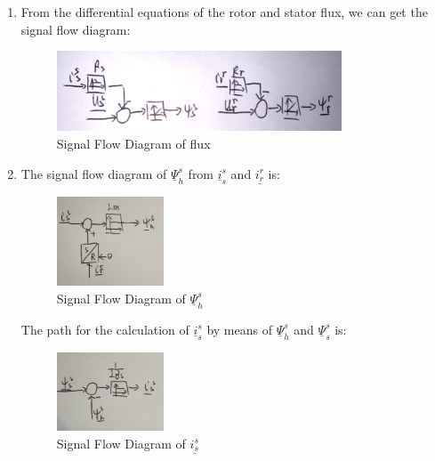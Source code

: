 \documentclass[12pt,a4paper, openany]{book}
\begin{document}
\begin{enumerate}
\item 
From the differential equations of the rotor and stator flux, we can get the signal flow diagram:
\begin{figure}[H]
    \centering
    \includegraphics[width=0.8\textwidth]{figures/SignalFlowDiagram.png}
    \caption{Signal Flow Diagram of flux}
    \label{fig:SignalFlowDiagram}
\end{figure}
\item 
The signal flow diagram of $\underline{\Psi}_h^s$ from $\underline{i}_{s}^s$ and $\underline{i_{r}^r}$ is:
\begin{figure}[H]
    \centering
    \includegraphics[width=0.3\textwidth]{figures/SignalFlowDiagram_h.png}
    \caption{Signal Flow Diagram of $\underline{\Psi}_h^s$}
    \label{fig:SignalFlowDiagram_h}
\end{figure}

The  path for the calculation of $\underline{i}_{s}^s$ by means of $\underline{\Psi}_h^s$ and  $\underline{\Psi}_s^s$ is:
\begin{figure}[H]
    \centering
    \includegraphics[width=0.3\textwidth]{figures/SignalFlowDiagram_is.png}
    \caption{Signal Flow Diagram of $\underline{i_{s}^s}$}
    \label{fig:SignalFlowDiagram_is}
\end{figure}


\end{enumerate}
\end{document}
